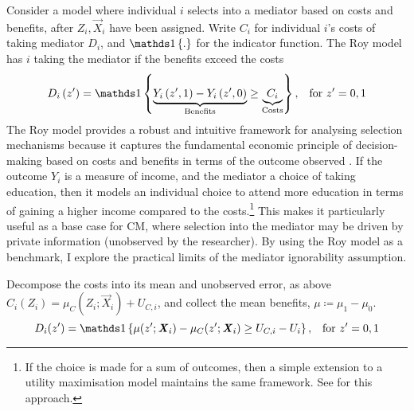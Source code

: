 Consider a model where individual $i$ selects into a mediator based on costs and benefits, after $Z_i, \vec X_i$ have been assigned.
Write $C_i$ for individual $i$'s costs of taking mediator $D_i$, and $\indicator{.}$ for the indicator function.
The Roy model has $i$ taking the mediator if the benefits exceed the costs
\begin{equation}
    \label{eqn:roy-model}
    D_i \left( z' \right) = \indicator{
    \underbrace{Y_i\left( z', 1 \right) - Y_i\left( z', 0 \right)}_{\text{Benefits}}
    \geq \underbrace{C_i}_{\text{Costs}}}, \;\;\; \text{for } z'=0,1
\end{equation}
The Roy model provides a robust and intuitive framework for analysing selection mechanisms because it captures the fundamental economic principle of decision-making based on costs and benefits in terms of the outcome observed \citep{roy1951some,heckman1990empirical}.
If the outcome $Y_i$ is a measure of income, and the mediator a choice of taking education, then it models an individual choice to attend more education in terms of gaining a higher income compared to the costs.\footnote{
    If the choice is made for a sum of outcomes, then a simple extension to a utility maximisation model maintains the same framework.
    See \cite{heckman1990empirical} for this approach.
}
This makes it particularly useful as a base case for CM, where selection into the mediator may be driven by private information (unobserved by the researcher).
By using the Roy model as a benchmark, I explore the practical limits of the mediator ignorability assumption.

Decompose the costs into its mean and unobserved error, as above $C_i(Z_i) = \mu_{C}(Z_i; \vec X_i) + U_{C,i}$, and collect the mean benefits, $\mu \coloneqq \mu_1 - \mu_0$.
\[ D_i(z') = \indicator{
    \mu(z'; \vec X_i) - \mu_C(z'; \vec X_i) \geq U_{C,i} - U_i }
        , \;\;\; \text{for } z'=0,1 \]


